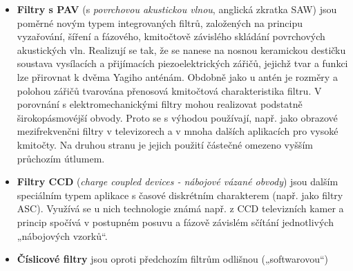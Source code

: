 {\begin{itemize}
                elektrický. Chovají se tedy vesměs jako pásmové propusti. Podle typu mechanického
                rezonátoru je lze dělit na různé skupiny. Dříve byly používány např. magnetostrikční
                filtry a dnes jsou používané nejčastěji \emph{piezokeramické filtry} (např.
                mezifrekvenčni filtry \SI{455}{\kilo\hertz} a \SI{10.7}{\mega\hertz}).
                Zvláštním typem je \emph{krystalový filtr}, který odpovídá v podstatě složenému
                rezonančnímu obvodu s vysokým činitelem jakosti (řádové \num{10000}) a vysokou
                stabilitou rezonančního kmitočtu. Nejčastěji se využívá ve stabilních oscilátorech.
                Vzhledem k vysokému a nenastavitelnému činiteli jakosti a nenastavitelnému
                rezonančnímu kmitočtu se krystaly jako filtry používají velmi omezené. Zapojením
                většího počtu krystalů s velmi přesným výběrem lze realizovat úzký pásmový filtr pro
                speciální aplikace jako např. úzkopásmové mezifrekvenčni filtry s vysokým
                rezonančním kmitočtem.
          \item \textbf{Filtry s PAV} (s \emph{povrchovou akustickou vlnou}, anglická zkratka SAW)
                jsou poměrné novým typem integrovaných filtrů, založených na principu vyzařování,
                šíření a fázového, kmitočtově závislého skládání povrchových akustických vln.
                Realizují se tak, že se nanese na nosnou keramickou destičku soustava vysílacích a
                přijímacích piezoelektrických zářičů, jejichž tvar a funkci lze přirovnat k dvěma
                Yagiho anténám. Obdobně jako u antén je rozměry a polohou zářičů tvarována přenosová
                kmitočtová charakteristika filtru. V porovnání s elektromechanickými filtry mohou
                realizovat podstatně širokopásmovéjší obvody. Proto se s výhodou používají, např.
                jako obrazové mezifrekvenčni filtry v televizorech a v mnoha dalších aplikacích pro
                vysoké kmitočty. Na druhou stranu je jejich použití částečné omezeno vyšším
                průchozím útlumem.
          \item \textbf{Filtry CCD} (\emph{charge coupled devices - nábojové vázané obvody}) jsou
                dalším speciálním typem aplikace s časové diskrétním charakterem (např. jako filtry
                ASC). Využívá se u nich technologie známá např. z CCD televizních kamer a princip
                spočívá v postupném posuvu a fázově závislém sčítání jednotlivých „nábojových
                vzorků“.
          \item \textbf{Číslicové filtry} jsou oproti předchozím filtrům odlišnou („softwarovou“)

\end{itemize}}

